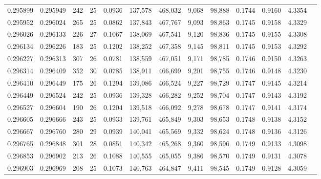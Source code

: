 \begin{tabular}{rrrrrrrrrrrrr}
0.295899 & 0.295949 &   242 &  25 &                                     0.0936 & 137,578 & 468,032 &   9,068 &  98,888 & 0.1744 & 0.9160 & 4.3354 \\
0.295952 & 0.296024 &   265 &  25 &                                     0.0862 & 137,843 & 467,767 &   9,093 &  98,863 & 0.1745 & 0.9158 & 4.3329 \\
0.296026 & 0.296133 &   226 &  27 &                                     0.1067 & 138,069 & 467,541 &   9,120 &  98,836 & 0.1745 & 0.9155 & 4.3308 \\
0.296134 & 0.296226 &   183 &  25 &                                     0.1202 & 138,252 & 467,358 &   9,145 &  98,811 & 0.1745 & 0.9153 & 4.3292 \\
0.296227 & 0.296313 &   307 &  26 &                                     0.0781 & 138,559 & 467,051 &   9,171 &  98,785 & 0.1746 & 0.9150 & 4.3263 \\
0.296314 & 0.296409 &   352 &  30 &                                     0.0785 & 138,911 & 466,699 &   9,201 &  98,755 & 0.1746 & 0.9148 & 4.3230 \\
0.296410 & 0.296449 &   175 &  26 &                                     0.1294 & 139,086 & 466,524 &   9,227 &  98,729 & 0.1747 & 0.9145 & 4.3214 \\
0.296449 & 0.296524 &   242 &  25 &                                     0.0936 & 139,328 & 466,282 &   9,252 &  98,704 & 0.1747 & 0.9143 & 4.3192 \\
0.296527 & 0.296604 &   190 &  26 &                                     0.1204 & 139,518 & 466,092 &   9,278 &  98,678 & 0.1747 & 0.9141 & 4.3174 \\
0.296605 & 0.296666 &   243 &  25 &                                     0.0933 & 139,761 & 465,849 &   9,303 &  98,653 & 0.1748 & 0.9138 & 4.3152 \\
0.296667 & 0.296760 &   280 &  29 &                                     0.0939 & 140,041 & 465,569 &   9,332 &  98,624 & 0.1748 & 0.9136 & 4.3126 \\
0.296765 & 0.296848 &   301 &  28 &                                     0.0851 & 140,342 & 465,268 &   9,360 &  98,596 & 0.1749 & 0.9133 & 4.3098 \\
0.296853 & 0.296902 &   213 &  26 &                                     0.1088 & 140,555 & 465,055 &   9,386 &  98,570 & 0.1749 & 0.9131 & 4.3078 \\
0.296903 & 0.296969 &   208 &  25 &                                     0.1073 & 140,763 & 464,847 &   9,411 &  98,545 & 0.1749 & 0.9128 & 4.3059 \\

\end{tabular}
